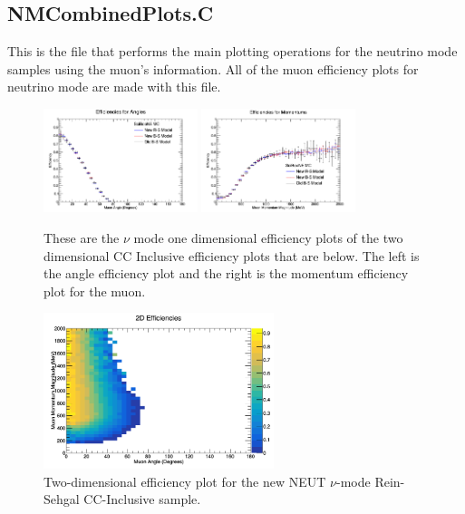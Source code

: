 \documentclass[11pt]{article}
\begin{document}
\subsection{NMCombinedPlots.C}
This is the file that performs the main plotting operations for the neutrino mode samples using the muon's information. All of the muon efficiency plots for neutrino mode are made with this file.

\begin{figure}[H]
\centering
\includegraphics[width=0.4\textwidth]{NMCombinedPlotsImages/22-NMCombinedPlots.png}
\includegraphics[width=0.4\textwidth]{NMCombinedPlotsImages/23-NMCombinedPlots.png}
\caption{These are the $\nu$ mode one dimensional efficiency plots of the two dimensional CC Inclusive efficiency plots that are below. The left is the angle efficiency plot and the right is the momentum efficiency plot for the muon.}
\end{figure}

\begin{figure}[H]
\centering
\includegraphics[width=0.6\textwidth]{CCInclusivePlots/2DEffCompareNMRS.png}
\caption{Two-dimensional efficiency plot for the new NEUT $\nu$-mode Rein-Sehgal CC-Inclusive sample.}
\end{figure}
\end{document}

